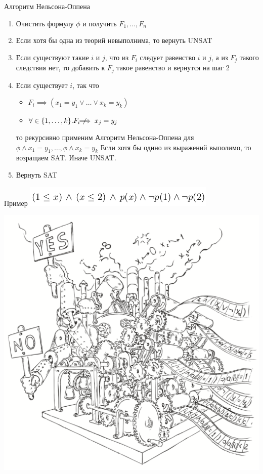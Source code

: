 \documentclass{beamer}
\begin{document}
\begin{frame}{Алгоритм Нельсона-Оппена}
\begin{enumerate}
\item Очистить формулу $\phi$ и получить $F_1, \dots, F_n$
\item Если хотя бы одна из теорий невыполнима, то вернуть UNSAT
\item Если существуют такие $i$ и $j$, что из $F_i$ следует равенство $i$ и $j$, а из $F_j$ такого следствия нет, то добавить к
$F_j$ такое равенство и вернутся на шаг 2
\item Если существует $i$, так что\newline
\begin{itemize}
\item $F_i \implies (x_1 = y_1 \vee \dots \vee x_k = y_k)$
\item $\forall \in \{1, \dots, k\}.F_i \not\!\!\!\!\implies x_j = y_j$
\end{itemize}
то рекурсивно применим Алгоритм Нельсона-Оппена для $\phi \wedge x_1 = y_1, \dots, \phi \wedge x_k = y_k$\newline
Если хотя бы одино из выражений выполимо, то возращаем SAT. Иначе UNSAT.
\item Вернуть SAT
\end{enumerate}
\end{frame}

\begin{frame}{Пример}
\includegraphics[scale=0.5]{ex4.png}\newline
\end{frame}

\begin{frame}
\includegraphics[scale=0.5]{../decision-procedure.png}
\end{frame}
\end{document}
